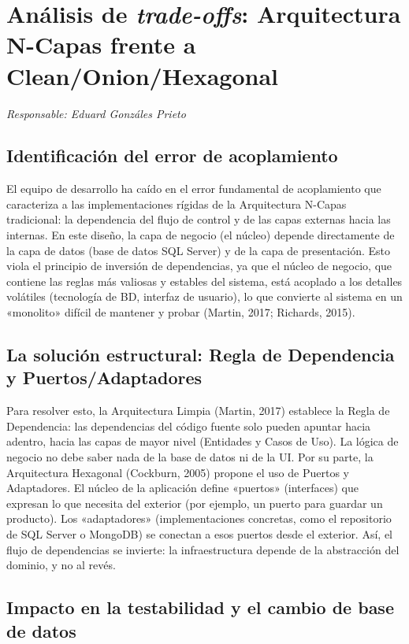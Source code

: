 \documentclass[11pt,a4paper]{article}
\newcommand{\responsable}[1]{\noindent\textit{Responsable: #1}\par\medskip}
\begin{document}
\section{Análisis de \emph{trade-offs}: Arquitectura N-Capas frente a Clean/Onion/Hexagonal}
\responsable{Eduard Gonzáles Prieto}

\subsection*{Identificación del error de acoplamiento}

El equipo de desarrollo ha caído en el error fundamental de acoplamiento que caracteriza a las
implementaciones rígidas de la Arquitectura N-Capas tradicional: la dependencia del flujo de
control y de las capas externas hacia las internas. En este diseño, la capa de negocio (el
núcleo) depende directamente de la capa de datos (base de datos SQL Server) y de la capa de
presentación. Esto viola el principio de inversión de dependencias, ya que el núcleo de
negocio, que contiene las reglas más valiosas y estables del sistema, está acoplado a los
detalles volátiles (tecnología de BD, interfaz de usuario), lo que convierte al sistema en un
«monolito» difícil de mantener y probar (Martin, 2017; Richards, 2015).

\subsection*{La solución estructural: Regla de Dependencia y Puertos/Adaptadores}

Para resolver esto, la Arquitectura Limpia (Martin, 2017) establece la Regla de Dependencia:
las dependencias del código fuente solo pueden apuntar hacia adentro, hacia las capas de mayor
nivel (Entidades y Casos de Uso). La lógica de negocio no debe saber nada de la base de datos
ni de la UI. Por su parte, la Arquitectura Hexagonal (Cockburn, 2005) propone el uso de
Puertos y Adaptadores. El núcleo de la aplicación define «puertos» (interfaces) que expresan
lo que necesita del exterior (por ejemplo, un puerto para guardar un producto). Los
«adaptadores» (implementaciones concretas, como el repositorio de SQL Server o MongoDB) se
conectan a esos puertos desde el exterior. Así, el flujo de dependencias se invierte: la
infraestructura depende de la abstracción del dominio, y no al revés.

\subsection*{Impacto en la testabilidad y el cambio de base de datos}
\end{document}
